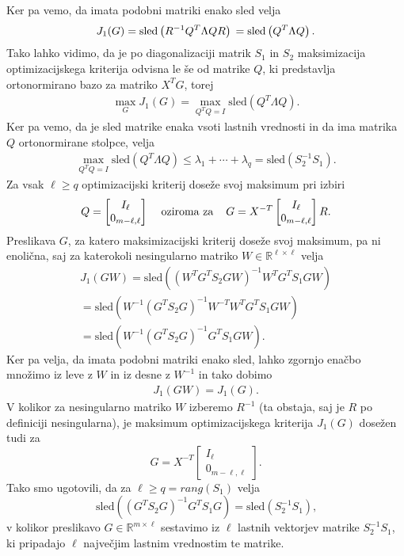 \documentclass[mat1]{article}
\theoremstyle{definition}
\begin{document}
Ker pa vemo, da imata podobni matriki enako sled velja
\begin{equation}
J_1(G)
=
\text{sled} \left( R^{-1} Q^T \Lambda QR \right)
\nonumber \\
=
\text{sled} \left(Q^T \Lambda Q \right)
\text{.}
\end{equation}
Tako lahko vidimo, da je po diagonalizaciji matrik $S_1$ in $S_2$ maksimizacija optimizacijskega kriterija odvisna le še od matrike $Q$, ki predstavlja ortonormirano bazo za matriko $X^T G$, torej
\begin{align*}
\max_G J_1(G) = \max_{Q^TQ=I} \text{sled} \left(Q^T \Lambda Q \right)
\text{.}
\end{align*}
Ker pa vemo, da je sled matrike enaka vsoti lastnih vrednosti in da ima matrika $Q$ ortonormirane stolpce, velja
\begin{align*}
\max_{Q^TQ=I} \text{sled} \left(Q^T \Lambda Q \right)
\leq
\lambda_1 + \cdots + \lambda_q
=
\text{sled} \left( S_2^{-1} S_1 \right)
\text{.}
\end{align*}
Za vsak $\ell \geq q$ optimizacijski kriterij doseže svoj maksimum pri izbiri
$$ Q = 
\begin{bmatrix}
I_{\ell} \\
0_{m-\ell, \ell}
\end{bmatrix}
\hspace{4mm}
\text{oziroma za}
\hspace{4mm}
G = 
X ^{-T}
\begin{bmatrix}
I_{\ell} \\
0_{m-\ell, \ell}
\end{bmatrix}
R
\text{.}
$$
Preslikava $G$, za katero maksimizacijski kriterij doseže svoj maksimum, pa ni enolična, saj za katerokoli nesingularno matriko $W \in \mathbb{R}^{\ell \times \ell}$ velja
\begin{align*}
J_1(GW) = 
\text{sled}\left( (W^T G^T S_2 G W)^{-1} W^T G^T S_1 GW \right)
\\
=
\text{sled}\left( W^{-1}(G^T S_2 G)^{-1}W^{-T} W^T G^T S_1 GW \right)
\\
=
\text{sled}\left( W^{-1}(G^T S_2 G)^{-1}G^T S_1 GW \right)
\text{.}
\end{align*}
Ker pa velja, da imata podobni matriki enako sled, lahko zgornjo enačbo množimo iz leve z $W$ in iz desne z $W^{-1}$ in tako dobimo
\begin{align*}
J_1(GW)
=
J_1(G)
\text{.}
\end{align*}
V kolikor za nesingularno matriko $W$ izberemo $R^{-1}$ (ta obstaja, saj je $R$ po definiciji nesingularna), je maksimum optimizacijskega kriterija $J_1(G)$ dosežen tudi za 
$$ G = X^{-T} 
\begin{bmatrix}
I_{\ell} \\
0_{m-\ell, \ell}
\end{bmatrix}
\text{.}
$$
Tako smo ugotovili, da za $\ell \geq q = rang(S_1)$ velja
$$
\text{sled} \left( (G^T S_2 G)^{-1} G^T S_1 G \right)
=
\text{sled} \left( S_2^{-1} S_1 \right)
\text{,}
$$
v kolikor preslikavo $G \in \mathbb{R}^{m \times \ell}$
sestavimo iz $\ell$ lastnih vektorjev matrike $S_2^{-1} S_1$, ki pripadajo $\ell$ največjim lastnim vrednostim te matrike.
\end{document}
